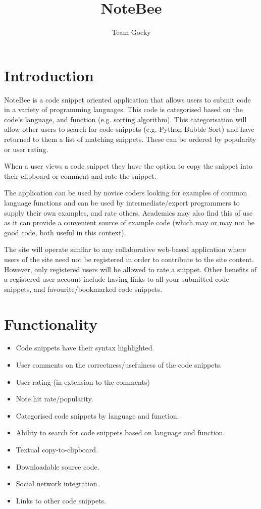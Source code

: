 \documentclass[11pt,a4paper]{article}
\title{NoteBee}
\author{Team Gocky}
\begin{document}
\maketitle

\tableofcontents
\pagebreak

\section{Introduction}

NoteBee is a code snippet oriented application that allows users to submit code
in a variety of programming languages. This code is categorised based on the
code's language, and function (e.g. sorting algorithm). This categorisation
will allow other users to search for code snippets (e.g. Python Bubble Sort)
and have returned to them a list of matching snippets. These can be ordered
by popularity or user rating.

When a user views a code snippet they have the option to copy the snippet into
their clipboard or comment and rate the snippet.

The application can be used by novice coders looking for examples of common
language functions and can be used by intermediate/expert programmers to supply
their own examples, and rate others. Academics may also find this of use as
it can provide a convenient source of example code (which may or may not be
good code, both useful in this context).

The site will operate similar to any collaborative web-based application
where users of the site need not be registered in order to contribute
to the site content. However, only registered users will be allowed to
rate a snippet. Other benefits of a registered user account include
having links to all your submitted code snippets, and
favourite/bookmarked code snippets.

\section{Functionality}

\begin{itemize}
\item Code snippets have their syntax highlighted.
\item User comments on the correctness/usefulness of the code snippets.
\item User rating (in extension to the comments)
\item Note hit rate/popularity.
\item Categorised code snippets by language and function.
\item Ability to search for code snippets based on language and function.
\item Textual copy-to-clipboard.
\item Downloadable source code.
\item Social network integration.
\item Links to other code snippets.
\end{itemize}
\end{document}
